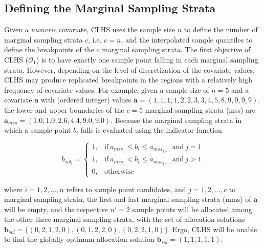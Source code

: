 \subsection{Defining the Marginal Sampling Strata}

Given a \emph{numeric} covariate, CLHS uses the sample size $n$ to define the number of marginal 
sampling strata $c$, i.e. $c = n$, and the interpolated sample quantiles to define the breakpoints of the 
$c$ marginal sampling strata. The first objective of CLHS ($\mathcal{O}_1$) is to have exactly one 
sample point falling in each marginal sampling strata. However, depending on the level of discretization of 
the covariate values, CLHS may produce replicated breakpoints in the regions with a relatively high 
frequency of covariate values. For example, given a sample size of $n = 5$ and a covariate $\boldsymbol{a}$ 
with (ordered integer) values $\boldsymbol{a} = (1, 1, 1, 1, 2, 2, 3, 3, 4, 5, 8, 9, 9, 9, 9)$, the lower and 
upper boundaries of the $c = 5$ marginal sampling strata (mss) are $\boldsymbol{a}_{mss} = (1.0, 1.0, 2.6, 
4.4, 9.0, 
9.0)$. 
Because the marginal sampling strata in which a sample point $b_i$ falls is evaluated using the indicator 
function

\begin{equation*} %
 b_{sol_i} = 
 \begin{cases}
  1, & \text{if}\ a_{mss_j} \leq b_i \leq a_{mss_{j + 1}}\ \text{and}\ j = 1 \\ 
  1, & \text{if}\ a_{mss_j} < b_i \leq a_{mss_{j + 1}}\ \text{and}\ j > 1 \\ 
  0, & \text{otherwise}
 \end{cases}
\end{equation*}

\noindent where $i = 1, 2, \ldots, n$ refers to sample point candidates, and $j = 1, 2, \ldots, c$ to 
marginal sampling strata, the first and last marginal sampling strata (mms) of $\boldsymbol{a}$ will be empty, 
and the respective $n' = 2$ sample points will be allocated among the other three marginal sampling strata, 
with the set of allocation solutions $\boldsymbol{b}_{sol} = \{(0, 2, 1, 2, 0), (0, 1, 2, 2, 0), (0, 2, 2, 1, 
0)\}$. Ergo, CLHS will be unable to find the globally optimum allocation solution $\boldsymbol{b}_{sol} = (1, 
1, 1, 1, 1)$.

